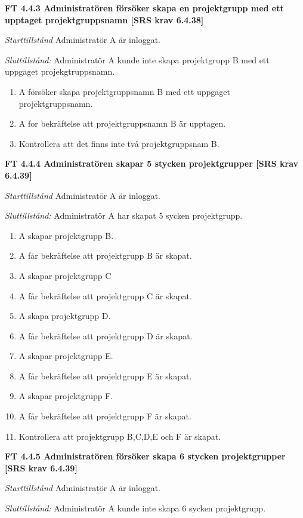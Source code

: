 \documentclass[a4paper]{article}
\begin{document}
\textbf{FT 4.4.3 Administratören försöker skapa en projektgrupp med ett upptaget projektgruppsnamn [SRS krav 6.4.38]}

\emph{Starttillstånd} Administratör A är inloggat.

\emph{Sluttillstånd:} Administratör A kunde inte skapa  projektgrupp B med ett uppgaget projekgtruppsnamn.

\begin{enumerate}
\item A försöker skapa  projektgruppsnamn B med ett uppgaget projektgruppsnamn.
\item A for bekräftelse att projektgruppsnamn B är upptagen.
\item Kontrollera att det finns inte två projektgruppsnam B.
\end{enumerate}

\textbf{FT 4.4.4 Administratören skapar 5 stycken projektgrupper [SRS krav 6.4.39]}

\emph{Starttillstånd} Administratör A är inloggat. 

\emph{Sluttillstånd:} Administratör A har skapat 5 sycken projektgrupp.

\begin{enumerate}
\item A skapar projektgrupp B.
\item A får bekräftelse att projektgrupp B är skapat.
\item A skapar projektgrupp C
\item A får bekräftelse att projektgrupp C är skapat.
\item A skapa projektgrupp D.
\item A får bekräftelse att projektgrupp D är skapat.
\item A skapar projektgrupp E.
\item A får bekräftelse att projektgrupp E är skapat.
\item A skapar projektgrupp F.
\item A får bekräftelse att projektgrupp F är skapat.
\item Kontrollera att projektgrupp B,C,D,E och F är skapat.
\end{enumerate}

\textbf{FT 4.4.5 Administratören försöker skapa 6 stycken projektgrupper [SRS krav 6.4.39]}

\emph{Starttillstånd} Administratör A är inloggat.

\emph{Sluttillstånd:} Administratör A kunde inte skapa 6 sycken  projektgrupp.
\end{document}
